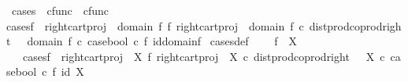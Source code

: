 \begin{isabellebody}
\endisatagproof
{\isafoldproof}%
%
\isadelimproof
%
\endisadelimproof
%
\isadelimdocument
%
\endisadelimdocument
%
\isatagdocument
%
\isamarkuptrue%
%
\endisatagdocument
{\isafolddocument}%
%
\isadelimdocument
%
\endisadelimdocument
{}\isamarkupfalse%
\ cases\ {\isacharcolon}{\kern0pt}{\isacharcolon}{\kern0pt}\ {\isachardoublequoteopen}cfunc\ {\isasymRightarrow}\ cfunc{\isachardoublequoteclose}\ \isanewline
{\isachardoublequoteopen}cases{\isacharparenleft}{\kern0pt}f{\isacharparenright}{\kern0pt}\ {\isacharequal}{\kern0pt}\ {\isacharparenleft}{\kern0pt}{\isacharparenleft}{\kern0pt}right{\isacharunderscore}{\kern0pt}cart{\isacharunderscore}{\kern0pt}proj\ {\isasymone}\ {\isacharparenleft}{\kern0pt}domain\ f{\isacharparenright}{\kern0pt}{\isacharparenright}{\kern0pt}\ {\isasymbowtie}\isactrlsub f\ {\isacharparenleft}{\kern0pt}right{\isacharunderscore}{\kern0pt}cart{\isacharunderscore}{\kern0pt}proj\ {\isasymone}\ {\isacharparenleft}{\kern0pt}domain\ f{\isacharparenright}{\kern0pt}{\isacharparenright}{\kern0pt}{\isacharparenright}{\kern0pt}\ {\isasymcirc}\isactrlsub c\ {\isacharparenleft}{\kern0pt}dist{\isacharunderscore}{\kern0pt}prod{\isacharunderscore}{\kern0pt}coprod{\isacharunderscore}{\kern0pt}right\ {\isasymone}\ {\isasymone}\ {\isacharparenleft}{\kern0pt}domain\ f{\isacharparenright}{\kern0pt}{\isacharparenright}{\kern0pt}\ {\isasymcirc}\isactrlsub c\ {\isasymlangle}case{\isacharunderscore}{\kern0pt}bool\ {\isasymcirc}\isactrlsub c\ f{\isacharcomma}{\kern0pt}\ id{\isacharparenleft}{\kern0pt}domain{\isacharparenleft}{\kern0pt}f{\isacharparenright}{\kern0pt}{\isacharparenright}{\kern0pt}{\isasymrangle}{\isachardoublequoteclose}\isanewline
\isanewline
{}\isamarkupfalse%
\ cases{\isacharunderscore}{\kern0pt}def{}{\isacharcolon}{\kern0pt}\ \isanewline
\ \ \ {\isachardoublequoteopen}f\ {\isacharcolon}{\kern0pt}\ X\ {\isasymrightarrow}\ {\isasymOmega}{\isachardoublequoteclose}\isanewline
\ \ \ {\isachardoublequoteopen}cases{\isacharparenleft}{\kern0pt}f{\isacharparenright}{\kern0pt}\ {\isacharequal}{\kern0pt}\ {\isacharparenleft}{\kern0pt}{\isacharparenleft}{\kern0pt}right{\isacharunderscore}{\kern0pt}cart{\isacharunderscore}{\kern0pt}proj\ {\isasymone}\ X{\isacharparenright}{\kern0pt}\ {\isasymbowtie}\isactrlsub f\ {\isacharparenleft}{\kern0pt}right{\isacharunderscore}{\kern0pt}cart{\isacharunderscore}{\kern0pt}proj\ {\isasymone}\ X{\isacharparenright}{\kern0pt}{\isacharparenright}{\kern0pt}\ {\isasymcirc}\isactrlsub c\ {\isacharparenleft}{\kern0pt}dist{\isacharunderscore}{\kern0pt}prod{\isacharunderscore}{\kern0pt}coprod{\isacharunderscore}{\kern0pt}right\ {\isasymone}\ {\isasymone}\ X{\isacharparenright}{\kern0pt}\ {\isasymcirc}\isactrlsub c\ {\isasymlangle}case{\isacharunderscore}{\kern0pt}bool\ {\isasymcirc}\isactrlsub c\ f{\isacharcomma}{\kern0pt}\ id\ X{\isasymrangle}{\isachardoublequoteclose}\isanewline

\end{isabellebody}

